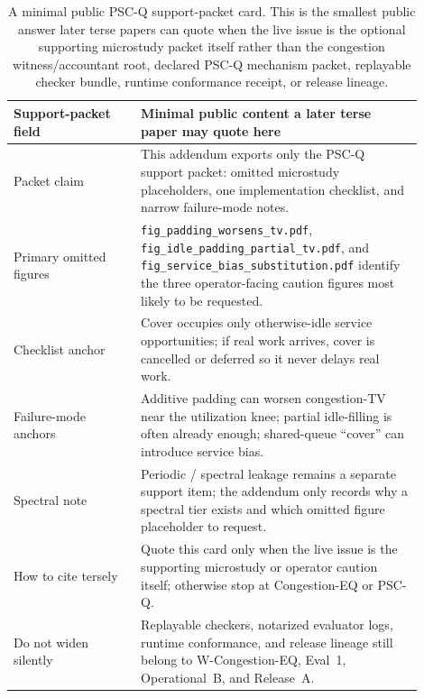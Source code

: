 \documentclass[11pt]{article}
\theoremstyle{definition}
\theoremstyle{remark}
\begin{document}
\begin{table}[t]
\centering
\begin{tabular}{@{}p{0.28\linewidth}p{0.62\linewidth}@{}}
\toprule
Support-packet field & Minimal public content a later terse paper may quote here \\
\midrule
Packet claim & This addendum exports only the PSC-Q support packet: omitted microstudy placeholders, one implementation checklist, and narrow failure-mode notes. \\
Primary omitted figures & \texttt{fig\_padding\_worsens\_tv.pdf}, \texttt{fig\_idle\_padding\_partial\_tv.pdf}, and \texttt{fig\_service\_bias\_substitution.pdf} identify the three operator-facing caution figures most likely to be requested. \\
Checklist anchor & Cover occupies only otherwise-idle service opportunities; if real work arrives, cover is cancelled or deferred so it never delays real work. \\
Failure-mode anchors & Additive padding can worsen congestion-TV near the utilization knee; partial idle-filling is often already enough; shared-queue ``cover'' can introduce service bias. \\
Spectral note & Periodic / spectral leakage remains a separate support item; the addendum only records why a spectral tier exists and which omitted figure placeholder to request. \\
How to cite tersely & Quote this card only when the live issue is the supporting microstudy or operator caution itself; otherwise stop at Congestion-EQ or PSC-Q. \\
Do not widen silently & Replayable checkers, notarized evaluator logs, runtime conformance, and release lineage still belong to W-Congestion-EQ, Eval~1, Operational~B, and Release~A. \\
\bottomrule
\end{tabular}
\caption{A minimal public PSC-Q support-packet card. This is the smallest public answer later terse papers can quote when the live issue is the optional supporting microstudy packet itself rather than the congestion witness/accountant root, declared PSC-Q mechanism packet, replayable checker bundle, runtime conformance receipt, or release lineage.}
\label{tab:pscq-addendum-card}
\end{table}
\end{document}
